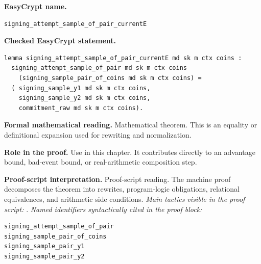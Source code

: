 \begin{formaltheorem}
\noindent\textbf{EasyCrypt name.}
\begin{lstlisting}[language=EasyCrypt,basicstyle=\ttfamily\scriptsize]
signing_attempt_sample_of_pair_currentE
\end{lstlisting}
\noindent\textbf{Checked EasyCrypt statement.}
\begin{lstlisting}[language=EasyCrypt,basicstyle=\ttfamily\scriptsize]
lemma signing_attempt_sample_of_pair_currentE md sk m ctx coins :
  signing_attempt_sample_of_pair md sk m ctx coins
    (signing_sample_pair_of_coins md sk m ctx coins) =
  ( signing_sample_y1 md sk m ctx coins,
    signing_sample_y2 md sk m ctx coins,
    commitment_raw md sk m ctx coins).
\end{lstlisting}
\noindent\textbf{Formal mathematical reading.}
Mathematical theorem. This is an equality or definitional expansion used for rewriting and normalization.

\noindent\textbf{Role in the proof.}
Use in this chapter. It contributes directly to an advantage bound, bad-event bound, or real-arithmetic composition step.

\noindent\textbf{Proof-script interpretation.}
Proof-script reading. The machine proof decomposes the theorem into rewrites, program-logic obligations, relational equivalences, and arithmetic side conditions.
\emph{Main tactics visible in the proof script:} .
\emph{Named identifiers syntactically cited in the proof block:}
\begin{lstlisting}[language=EasyCrypt,basicstyle=\ttfamily\scriptsize]
signing_attempt_sample_of_pair
signing_sample_pair_of_coins
signing_sample_pair_y1
signing_sample_pair_y2
\end{lstlisting}

\end{formaltheorem}

